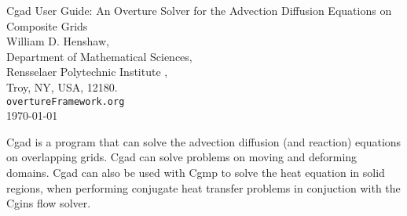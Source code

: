 \documentclass[10pt]{article}
\begin{document}








% 



\baselineskip
\begin{flushleft}
{\Large
Cgad User Guide: An Overture Solver for the Advection Diffusion Equations on Composite Grids \\
}
\vspace{2\baselineskip}
William D. Henshaw,  \\
Department of Mathematical Sciences,  \\
Rensselaer Polytechnic Institute ,    \\
Troy, NY, USA, 12180.  \\
{\tt overtureFramework.org} \\
\vspace{\baselineskip}
\today\\
\vspace{\baselineskip}

\vspace{4\baselineskip}


Cgad is a program that can solve the advection diffusion (and reaction) equations on overlapping grids.
Cgad can solve problems on moving and deforming domains.
Cgad can also be used with Cgmp to solve the heat equation in solid regions, when performing conjugate heat
transfer problems in conjuction with the Cgins flow solver.


\end{flushleft}
\end{document}
